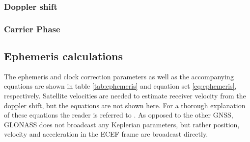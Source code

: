 \subsubsection{Doppler shift}



\subsubsection{Carrier Phase} 

\subsection{Ephemeris calculations}
\label{sec:ephemeris}
The ephemeris and clock correction parameters as well as the accompanying equations are shown in table \ref{tab:ephemeris} and equation set \ref{eq:ephemeris}, respectively. Satellite velocities are needed to estimate receiver velocity from the doppler shift, but the equations are not shown here. For a thorough explanation of these equations the reader is referred to \cite{zhang2006gps}. As opposed to the other GNSS, GLONASS does not broadcast any Keplerian parameters, but rather position, velocity and acceleration in the ECEF frame are broadcast directly. \cite{groves2013principles}\\

